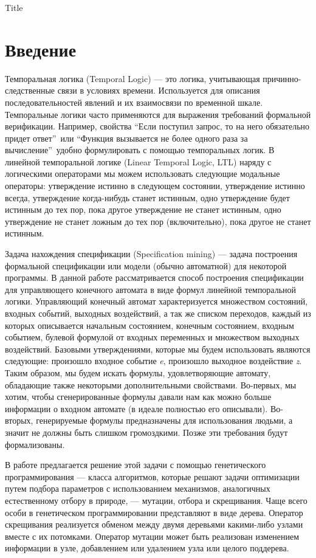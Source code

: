 \documentclass[12pt,fleqn]{article}
\begin{document}
\setlength{\grammarparsep}{0pt plus 1pt minus 1pt}

Title

\section*{Введение}

Темпоральная логика (Temporal Logic) --- это логика, учитывающая причинно-следственные связи в условиях времени.
Используется для описания последовательностей явлений и их взаимосвязи по временной шкале.
Темпоральные логики часто применяются для выражения требований формальной верификации.
Например, свойства ``Если поступил запрос, то на него обязательно придет ответ''\ или
``Функция вызывается не более одного раза за вычисление''\ удобно формулировать с помощью темпоральных логик.
В линейной темпоральной логике (Linear Temporal Logic, LTL) наряду с логическими операторами мы можем 
использовать следующие модальные операторы: утверждение истинно в следующем состоянии,
утверждение истинно всегда, утверждение когда-нибудь станет истинным,
одно утверждение будет истинным до тех пор, пока другое утверждение не станет истинным,
одно утверждение не станет ложным до тех пор (включительно), пока другое не станет истинным.

Задача нахождения спецификации (Specification mining) --- задача построения формальной спецификации или модели
(обычно автоматной) для некоторой программы. В данной работе рассматривается способ построения спецификации
для управляющего конечного автомата в виде формул линейной темпоральной логики.
Управляющий конечный автомат характеризуется множеством состояний, входных событий, выходных воздействий,
а так же списком переходов, каждый из которых описывается начальным состоянием, конечным состоянием,
входным событием, булевой формулой от входных переменных и множеством выходных воздействий.
Базовыми утверждениями, которые мы будем использовать являются следующие: произошло входное событие
\emph{e}, произошло выходное воздействие \emph{z}. Таким образом, мы будем искать формулы, удовлетворяющие автомату,
обладающие также некоторыми дополнительными свойствами. Во-первых, мы хотим, чтобы сгенерированные
формулы давали нам как можно больше информации о входном автомате (в идеале полностью его описывали).
Во-вторых, генерируемые формулы предназначены для использования людьми, а значит не должны быть слишком громоздкими.
Позже эти требования будут формализованы.

В работе предлагается решение этой задачи с помощью генетического программирования --- класса алгоритмов,
которые решают задачи оптимизации путем подбора параметров с использованием механизмов, аналогичных естественному
отбору в природе, --- мутации, отбора и скрещивания. Чаще всего особи в генетическом программировании представляют
в виде дерева. Оператор скрещивания реализуется обменом между двумя деревьями какими-либо узлами вместе с их
потомками. Оператор мутации может быть реализован изменением информации в узле, добавлением или удалением узла
или целого поддерева.
\end{document}
